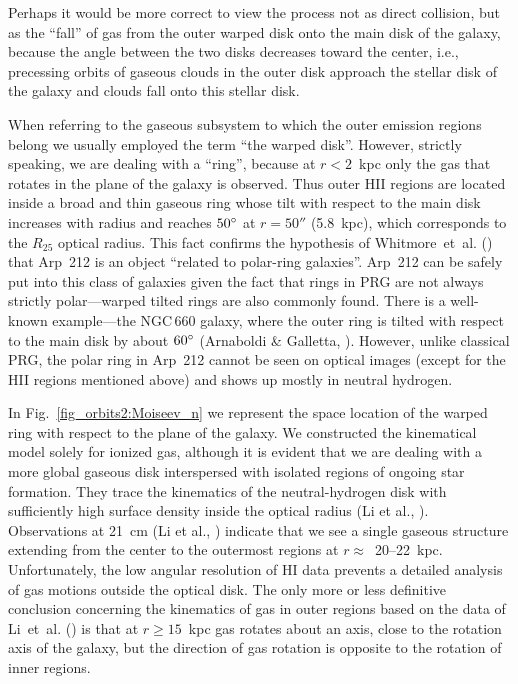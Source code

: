 \documentclass{ab}
\def\degr{\hbox{$^\circ$}}
\begin{document}
Perhaps it would be more correct to view the process not as direct collision, but as the ``fall'' of gas from the outer warped disk onto the main disk of the galaxy, because the angle between the two disks decreases
toward the center, i.e., precessing orbits of gaseous clouds in the outer disk approach the stellar disk of the galaxy and clouds fall onto this stellar disk.

When referring to the gaseous subsystem to which the outer
emission regions belong we usually employed the term ``the warped
disk''. However, strictly speaking, we are dealing with a
``ring'', because at  $r<2$~kpc only the gas that rotates in the
plane of the galaxy is observed. Thus outer HII regions are
located inside a broad and thin gaseous ring whose tilt with
respect to the main disk increases with radius and reaches
$50\degr$ at  $r=50''$ (5.8~kpc), which
corresponds to the $R_{25}$ optical radius. This fact confirms the
hypothesis of Whitmore~et~al. (\cite{w90:Moiseev_n}) that Arp~212 is
an object ``related to polar-ring galaxies''. Arp~212 can be
safely put into this class of galaxies given the fact that rings
in PRG are not always strictly polar---warped tilted rings are
also commonly found. There is a well-known example---the NGC\,660
galaxy, where the outer ring is tilted with respect to the main
disk by about $60\degr$ (Arnaboldi  \&  Galletta, \cite{arnaboldi93:Moiseev_n}). However,
unlike classical PRG, the polar ring in Arp~212 cannot be seen on
optical images (except for the HII regions mentioned above) and
shows up mostly in neutral hydrogen.

In Fig.~\ref{fig_orbits2:Moiseev_n} we represent the space
location of the warped ring with respect to the plane of the
galaxy. We constructed the kinematical model solely for ionized
gas, although it is evident that we are dealing with a more global
gaseous disk interspersed with isolated regions of ongoing star
formation. They trace the kinematics of the neutral-hydrogen disk
with sufficiently high surface density inside the optical
radius (Li et al., \cite{li:Moiseev_n}). Observations at 21~cm
(Li et al., \cite{li:Moiseev_n}) indicate that we see a single gaseous
structure extending from the center to the outermost regions at
\mbox{$r\approx$ 20--22~kpc}. Unfortunately, the low angular
resolution of HI data prevents a detailed analysis of gas
motions outside the optical disk. The only more or less
definitive conclusion concerning the kinematics of gas in outer
regions  based on the data of Li~et~al. (\cite{li:Moiseev_n})  is that at $r\geq15$~kpc gas rotates about an axis, close to the rotation axis of the galaxy, but the direction of gas rotation is opposite
to the rotation of inner regions.
\end{document}
